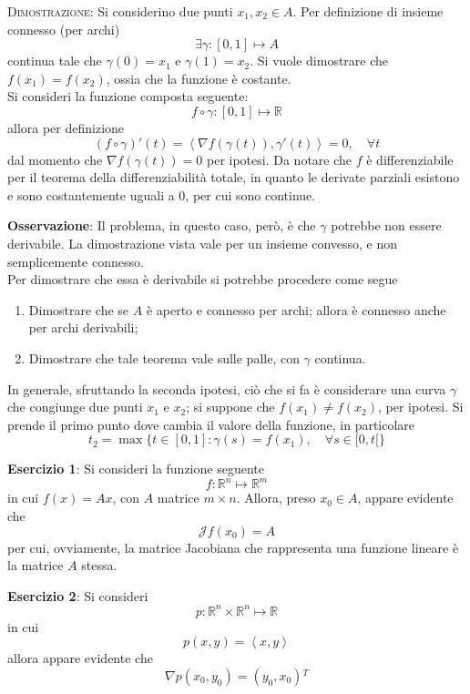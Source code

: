 \documentclass[a4paper]{extarticle}
\begin{document}
\vspace{2em}
\noindent
\normalfont \normalsize
\textsc{Dimostrazione}: Si considerino due punti $x_1,x_2 \in A$. Per definizione di insieme connesso (per archi)
\[\exists \gamma : [0,1] \longmapsto A\]
continua tale che $\gamma(0)=x_1$ e $\gamma(1)=x_2$. Si vuole dimostrare che $f(x_1)=f(x_2)$, ossia che la funzione è costante.\\
Si consideri la funzione composta seguente:
\[f \circ \gamma : [0,1] \longmapsto \mathbb{R}\]
allora per definizione
\[(f \circ \gamma)'(t) = \left<\nabla f(\gamma(t)), \gamma ' (t)\right> = 0, \hspace{1em} \forall t\]
dal momento che $\nabla f(\gamma(t)) = 0$ per ipotesi. Da notare che $f$ è differenziabile per il teorema della differenziabilità totale, in quanto le derivate parziali esistono e sono costantemente uguali a $0$, per cui sono continue.

\vspace{1em}
\noindent
\textbf{Osservazione}: Il problema, in questo caso, però, è che $\gamma$ potrebbe non essere derivabile. La dimostrazione vista vale per un insieme convesso, e non semplicemente connesso.\\
Per dimostrare che essa è derivabile si potrebbe procedere come segue
\begin{enumerate}
    \item Dimostrare che se $A$ è aperto e connesso per archi; allora è connesso anche per archi derivabili;
    \item Dimostrare che tale teorema vale sulle palle, con $\gamma$ continua.
\end{enumerate}
In generale, sfruttando la seconda ipotesi, ciò che si fa è considerare una curva $\gamma$ che congiunge due punti $x_1$ e $x_2$; si suppone che $f(x_1) \neq f(x_2)$, per ipotesi. Si prende il primo punto dove cambia il valore della funzione, in particolare
\[t_2 = \max \{t \in [0,1] : \gamma(s) = f(x_1), \hspace{1em} \forall s \in [0,t[\}\]

\vspace{2em}
\noindent
\textbf{Esercizio 1}: Si consideri la funzione seguente
\[f : \mathbb{R}^n \longmapsto \mathbb{R}^m\]
in cui $f(x)=A x$, con $A$ matrice $m \times n$. Allora, preso $x_0 \in A$, appare evidente che
\[\mathcal{J} f(x_0) = A\]
per cui, ovviamente, la matrice Jacobiana che rappresenta una funzione lineare è la matrice $A$ stessa.

\vspace{2em}
\noindent
\textbf{Esercizio 2}: Si consideri
\[p : \mathbb{R}^n \times \mathbb{R}^n \longmapsto \mathbb{R}\]
in cui
\[p(x,y) = \left<x,y\right>\]
allora appare evidente che
\[\nabla p(x_0,y_0) = (y_0,x_0){^T}\]
\end{document}
